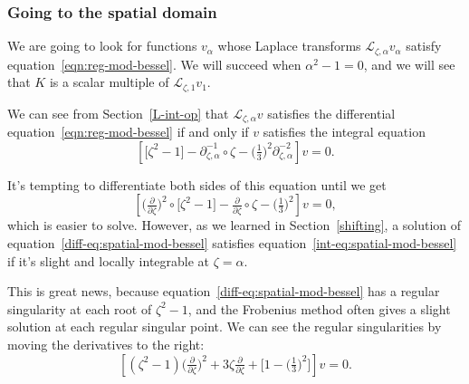 \documentclass{article}
\theoremstyle{definition}
\newcommand{\fracderiv}[3]{\partial^{#1}_{#2, #3}}
\newcommand{\laplace}{\mathcal{L}}
\begin{document}
\subsubsection{Going to the spatial domain}\label{spatial}
We are going to look for functions $v_\alpha$ whose Laplace transforms $\laplace_{\zeta, \alpha} v_\alpha$ satisfy equation~\eqref{eqn:reg-mod-bessel}. We will succeed when $\alpha^2 - 1 = 0$, and we will see that $K$ is a scalar multiple of $\laplace_{\zeta, 1} v_1$.

We can see from Section~\ref{L-int-op} that $\laplace_{\zeta, \alpha} v$ satisfies the differential equation~\eqref{eqn:reg-mod-bessel} if and only if $v$ satisfies the integral equation
\begin{equation}\label{int-eq:spatial-mod-bessel}
\left[ \big[ \zeta^2 - 1 \big] - \fracderiv{-1}{\zeta}{\alpha} \circ \zeta - \big(\tfrac{1}{3}\big)^2 \fracderiv{-2}{\zeta}{\alpha} \right] v = 0.
\end{equation}

It's tempting to differentiate both sides of this equation until we get
\begin{equation}\label{diff-eq:spatial-mod-bessel}
\left[ \big(\tfrac{\partial}{\partial \zeta}\big)^2 \circ \big[ \zeta^2 - 1 \big] - \tfrac{\partial}{\partial \zeta} \circ \zeta - \big(\tfrac{1}{3}\big)^2 \right] v = 0,
\end{equation}
which is easier to solve. However, as we learned in Section~\ref{shifting}, a solution of equation~\eqref{diff-eq:spatial-mod-bessel} satisfies equation~\eqref{int-eq:spatial-mod-bessel} if it's slight and locally integrable at $\zeta = \alpha$. 

This is great news, because equation~\eqref{diff-eq:spatial-mod-bessel} has a regular singularity at each root of $\zeta^2 - 1$, and the Frobenius method often gives a slight solution at each regular singular point. We can see the regular singularities by moving the derivatives to the right:
\[ \left[ (\zeta^2 - 1) \big(\tfrac{\partial}{\partial \zeta}\big)^2 + 3\zeta \tfrac{\partial}{\partial \zeta} + \big[ 1 - \big(\tfrac{1}{3}\big)^2 \big] \right] v = 0. \]
\end{document}
